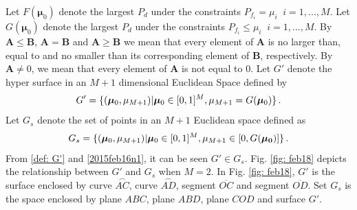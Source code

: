 Let $F(\boldsymbol{\mu}_0)$ denote the largest $P_d$ under the constraints $P_{f_i} = \mu_i\;\;i = 1, ..., M$.
Let $G(\boldsymbol{\mu}_0)$ denote the largest $P_d$ under the constraints $P_{f_i} \leq \mu_i\;\;i = 1, ..., M$.
By $\mathbf{A} \leq \mathbf{B}$, $\mathbf{A} = \mathbf{B}$ and  $\mathbf{A} \geq \mathbf{B}$ we mean that every element of $\mathbf{A}$ is no larger than, equal to and no smaller than its corresponding element of $\mathbf{B}$, respectively. 
By $\mathbf{A} \neq 0$, we mean that every element of $\mathbf{A}$ is not equal to $0$. 
Let $G'$ denote the hyper surface in an $M+1$ dimensional Euclidean Space defined by 
\begin{equation}
 \label{def: G'}
 G' = \{(\boldsymbol{\mu}_0, \mu_{M+1})  | \boldsymbol{\mu}_0 \in [0, 1]^M, \mu_{M+1}= G(\boldsymbol{\mu}_0) \}\,.
\end{equation}
Let $G_s$ denote the set of points in an $M+1$ Euclidean space defined as 
\begin{equation}
  \label{2015feb16n1}
G_s =  \{(\boldsymbol{\mu}_0, \mu_{M+1}) | \boldsymbol{\mu}_0\in [0, 1]^M, \mu_{M+1} \in [0, G(\mathbf{\boldsymbol{\mu}_0})]
    \}\,.
  \end{equation}
  From \eqref{def: G'} and \eqref{2015feb16n1}, it can be seen $G' \in G_s$. Fig. \ref{fig: feb18} depicts the relationship between $G'$ and $G_s$ when $M=2$. In Fig. \ref{fig: feb18}, $G'$ is the surface enclosed by curve $\stackrel\frown{AC}$, curve $\stackrel\frown{AD}$, segment $\overline{OC}$ and segment $\overline{OD}$. Set $G_s$ is the space enclosed by plane $ABC$, plane $ABD$, plane $COD$ and surface $G'$.  

